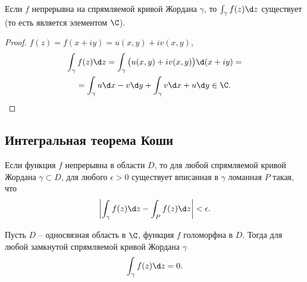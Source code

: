 \begin{theorem}
	Если $f$ непрерывна на спрямляемой кривой Жордана $\gamma $, то $\int_{\gamma } f(z)\d z$ существует (то есть является элементом $\C$).
\end{theorem}

\begin{proof}
	$f(z) = f(x + iy) = u(x,y) + iv(x,y)$,
	\begin{multline*}
		\int_{\gamma } f(z)\d z = \int_{\gamma } \big(u(x,y)+iv(x,y)\big)\d(x+iy) = \\ = \int_{\gamma } u\d x - v\d y + \int_{\gamma } v\d x + u\d y \in \C.
	\end{multline*}
\end{proof}

\subsection{Интегральная теорема Коши}

\begin{lemma}[Гауса]
	Если функция $f$ непрерывна в области $D$, то для любой спрямляемой кривой Жордана $\gamma \subset D$, для любого $\epsilon > 0$ существует вписанная в $\gamma $ ломанная $P$ такая, что
	\[
		\left|\int_{\gamma } f(z)\d z - \int_{P} f(z)\d z\right| < \epsilon.
	\]
\end{lemma}

\begin{theorem}
	Пусть $D$ -- односвязная область в $\C$, функция $f$ голоморфна в $D$. Тогда для любой замкнутой спрямляемой кривой Жордана $\gamma $
	\[
		\int_{\gamma } f(z)\d z = 0.
	\]
\end{theorem}

